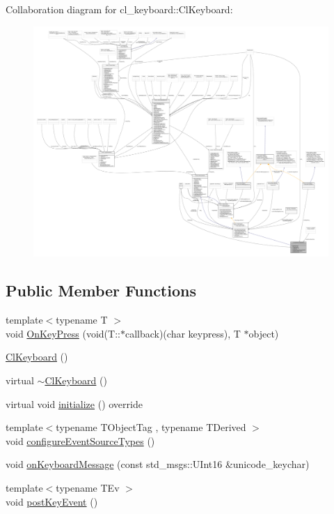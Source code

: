 Collaboration diagram for cl\+\_\+keyboard\+:\+:Cl\+Keyboard\+:
\nopagebreak
\begin{figure}[H]
\begin{center}
\leavevmode
\includegraphics[width=350pt]{classcl__keyboard_1_1ClKeyboard__coll__graph}
\end{center}
\end{figure}
\subsection*{Public Member Functions}
\begin{DoxyCompactItemize}
\item 
{\footnotesize template$<$typename T $>$ }\\void \hyperlink{classcl__keyboard_1_1ClKeyboard_ae9f4a6dc1ce18397394a432826970baa}{On\+Key\+Press} (void(T\+::$\ast$callback)(char keypress), T $\ast$object)
\item 
\hyperlink{classcl__keyboard_1_1ClKeyboard_aadf021c18ad32c50bd8b02f62293a47e}{Cl\+Keyboard} ()
\item 
virtual \hyperlink{classcl__keyboard_1_1ClKeyboard_af2f4ffb66639acb158d57d627a56d8e8}{$\sim$\+Cl\+Keyboard} ()
\item 
virtual void \hyperlink{classcl__keyboard_1_1ClKeyboard_af7f7fd9871ef5fcca400cd59d7b60775}{initialize} () override
\item 
{\footnotesize template$<$typename T\+Object\+Tag , typename T\+Derived $>$ }\\void \hyperlink{classcl__keyboard_1_1ClKeyboard_a9e7061e65652a6a5b8ec34ba97e59195}{configure\+Event\+Source\+Types} ()
\item 
void \hyperlink{classcl__keyboard_1_1ClKeyboard_aff50ebe6b1b4aad0ea5b933ab0f00ef4}{on\+Keyboard\+Message} (const std\+\_\+msgs\+::\+U\+Int16 \&unicode\+\_\+keychar)
\item 
{\footnotesize template$<$typename T\+Ev $>$ }\\void \hyperlink{classcl__keyboard_1_1ClKeyboard_ac1311ce9a6a64e590df2e1b088f0e733}{post\+Key\+Event} ()
\end{DoxyCompactItemize}
